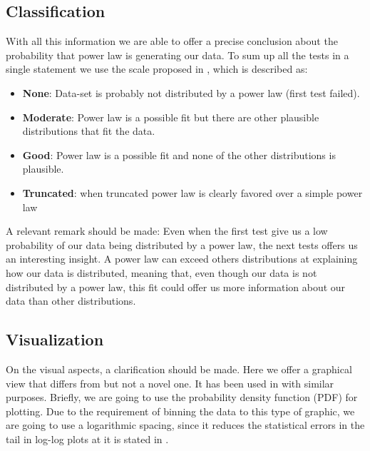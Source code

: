 \documentclass{article}
\begin{document}
\subsection{Classification}

With all this information we are able to offer a precise conclusion
about the probability that power law is generating our data. To sum up
all the tests in a single statement we use the scale proposed in
\cite{clauset2009power}, which is described as:
\begin{itemize}
\item \textbf{None}: Data-set is probably not distributed by a power
  law (first test failed).
\item \textbf{Moderate}: Power law is a possible fit but there are
  other plausible distributions that fit the data.
\item \textbf{Good}: Power law is a possible fit and none of the other
  distributions is plausible.
\item \textbf{Truncated}: when truncated power law is clearly favored
  over a simple power law
\end{itemize}

A relevant remark should be made: Even when the first test give us a
low probability of our data being distributed by a power law, the next
tests offers us an interesting insight. A power law can exceed others
distributions at explaining how our data is distributed, meaning that,
even though our data is not distributed by a power law, this fit could
offer us more information about our data than other distributions.

\subsection{Visualization}
 
On the visual aspects, a clarification should be made. Here we offer a
graphical view that differs from \cite{merelo2017self} but not a novel
one. It has been used in \cite{arafat2009commit} with similar
purposes.  Briefly, we are going to use the probability density
function (PDF) for plotting. Due to the requirement of binning the
data to this type of graphic, we are going to use a logarithmic
spacing, since it reduces the statistical errors in the tail in
log-log plots at it is stated in \cite{newman2005power}.


\end{document}
